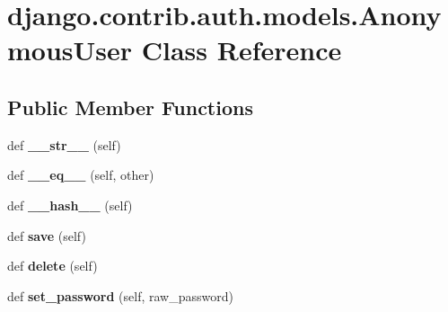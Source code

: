 \hypertarget{classdjango_1_1contrib_1_1auth_1_1models_1_1_anonymous_user}{}\section{django.\+contrib.\+auth.\+models.\+Anonymous\+User Class Reference}
\label{classdjango_1_1contrib_1_1auth_1_1models_1_1_anonymous_user}
\subsection*{Public Member Functions}
\begin{DoxyCompactItemize}
\item 
\mbox{\label{classdjango_1_1contrib_1_1auth_1_1models_1_1_anonymous_user_a2bbaa0c8ae4399402e30dc39de4908fc}} 
def {\bfseries \+\_\+\+\_\+str\+\_\+\+\_\+} (self)
\item 
\mbox{\label{classdjango_1_1contrib_1_1auth_1_1models_1_1_anonymous_user_a4734e760565e452f080162df88917352}} 
def {\bfseries \+\_\+\+\_\+eq\+\_\+\+\_\+} (self, other)
\item 
\mbox{\label{classdjango_1_1contrib_1_1auth_1_1models_1_1_anonymous_user_a8c7d85d3ca068394877c5a27ae04e0ce}} 
def {\bfseries \+\_\+\+\_\+hash\+\_\+\+\_\+} (self)
\item 
\mbox{\label{classdjango_1_1contrib_1_1auth_1_1models_1_1_anonymous_user_a40a8e7b3478f37f3d73a6c197c33c05e}} 
def {\bfseries save} (self)
\item 
\mbox{\label{classdjango_1_1contrib_1_1auth_1_1models_1_1_anonymous_user_aa545b2b6c297c7f483616f3ffde4fd9d}} 
def {\bfseries delete} (self)
\item 
\mbox{\label{classdjango_1_1contrib_1_1auth_1_1models_1_1_anonymous_user_a12dc0e2c1f18a8136fb6e357db4c2956}} 
def {\bfseries set\+\_\+password} (self, raw\+\_\+password)

\end{DoxyCompactItemize}
